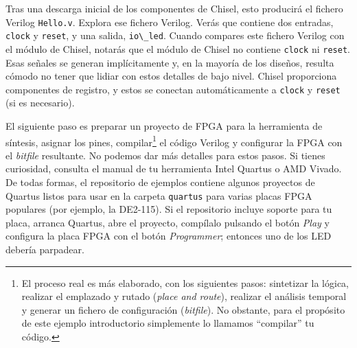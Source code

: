 \documentclass[%
    10pt,
    headinclude, footinclude=false,
    openright, %
    notitlepage,
    cleardoublepage=empty,
    headsepline,
    numbers=noenddot,
    bibliography=totoc, index=totoc,
    ]{scrbook}
\newcommand{\code}[1]{{\lstinline[basicstyle=\small\ttfamily]{#1}}}
\begin{document}
Tras una descarga inicial de los componentes de Chisel, esto producirá el fichero Verilog \code{Hello.v}.
Explora ese fichero Verilog. Verás que contiene dos entradas, \code{clock} y \code{reset},
y una salida, \code{io\_led}. Cuando compares este fichero Verilog con el módulo de Chisel,
notarás que el módulo de Chisel no contiene \code{clock} ni \code{reset}.
Esas señales se generan implícitamente y, en la mayoría de los diseños, resulta cómodo no tener que
lidiar con estos detalles de bajo nivel. Chisel proporciona componentes de registro, y estos
se conectan automáticamente a \code{clock} y \code{reset} (si es necesario).


El siguiente paso es preparar un proyecto de FPGA para la herramienta de síntesis, asignar los pines,
compilar\footnote{El proceso real es más elaborado, con los siguientes pasos: sintetizar la lógica,
realizar el emplazado y rutado (\emph{place and route}), realizar el análisis temporal y generar un fichero de
configuración (\emph{bitfile}).
No obstante, para el propósito de este ejemplo introductorio simplemente lo llamamos ``compilar''
tu código.} el código Verilog y configurar la FPGA con el \emph{bitfile} resultante.
No podemos dar más detalles para estos pasos. Si tienes curiosidad, consulta el manual de
tu herramienta Intel Quartus o AMD Vivado.
De todas formas, el repositorio de ejemplos contiene algunos proyectos de Quartus listos
para usar en la carpeta \code{quartus} para varias placas FPGA populares (por ejemplo, la DE2-115).
Si el repositorio incluye soporte para tu placa, arranca Quartus, abre el proyecto,
compílalo pulsando el botón \emph{Play} y configura la placa FPGA
con el botón \emph{Programmer}; entonces uno de los LED debería parpadear.
\end{document}

